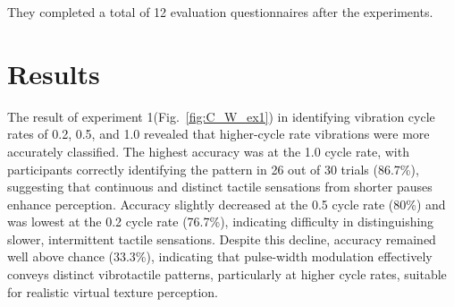 \documentclass[a4paper,twocolumn]{article}
\begin{document}


They completed a total of 12 evaluation questionnaires after the experiments. 			

\section{Results}

The result of experiment 1(Fig.~\ref{fig:C_W_ex1}) in identifying vibration cycle rates of 0.2, 0.5, and 1.0 revealed that higher-cycle rate vibrations were more accurately classified. The highest accuracy was at the 1.0 cycle rate, with participants correctly identifying the pattern in 26 out of 30 trials (86.7\%), suggesting that continuous and distinct tactile sensations from shorter pauses enhance perception. Accuracy slightly decreased at the 0.5 cycle rate (80\%) and was lowest at the 0.2 cycle rate (76.7\%), indicating difficulty in distinguishing slower, intermittent tactile sensations. Despite this decline, accuracy remained well above chance (33.3\%), indicating that pulse-width modulation effectively conveys distinct vibrotactile patterns, particularly at higher cycle rates, suitable for realistic virtual texture perception.

\end{document}
